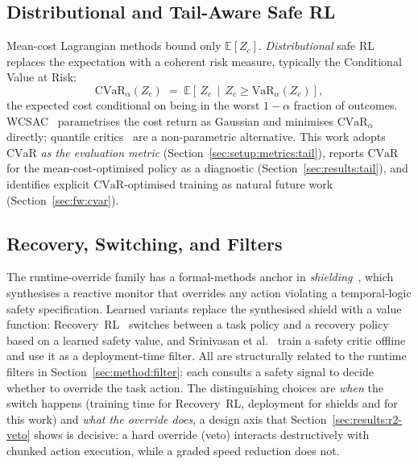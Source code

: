\documentclass[11pt,a4paper]{report}
\newcommand{\cvar}{\ensuremath{\mathrm{CVaR}}}
\begin{document}
\subsection{Distributional and Tail-Aware Safe RL}
\label{sec:bg:safe:distr}

Mean-cost Lagrangian methods bound only $\mathbb{E}[Z_c]$.
\emph{Distributional} safe RL replaces the expectation with a
coherent risk measure, typically the Conditional Value at Risk:
\begin{equation}
  \cvar_{\alpha}(Z_c) \;=\;
  \mathbb{E}\!\left[\, Z_c \,\middle|\, Z_c \ge \mathrm{VaR}_{\alpha}(Z_c) \right],
  \label{eq:cvar-def}
\end{equation}
the expected cost conditional on being in the worst $1-\alpha$
fraction of outcomes. WCSAC~\cite{yang2021wcsac,yang2023wcsacjournal}
parametrises the cost return as Gaussian and minimises
$\cvar_{\alpha}$ directly;
quantile critics~\cite{dabney2018qrdqn} are a non-parametric
alternative. This work adopts \cvar{} \emph{as the evaluation
metric} (Section~\ref{sec:setup:metrics:tail}), reports \cvar{} for
the mean-cost-optimised policy as a diagnostic
(Section~\ref{sec:results:tail}), and identifies explicit
\cvar{}-optimised training as natural future work
(Section~\ref{sec:fw:cvar}).

\subsection{Recovery, Switching, and Filters}
\label{sec:bg:safe:recovery}

The runtime-override family has a formal-methods anchor in
\emph{shielding}~\cite{alshiekh2018shielding,konighofer2025shields},
which synthesises a
reactive monitor that overrides any action violating a temporal-logic
safety specification. Learned variants replace the synthesised shield
with a value function: Recovery~RL~\cite{thananjeyan2021recovery}
switches between a task policy and a recovery policy based on a
learned safety value, and Srinivasan et
al.~\cite{srinivasan2020learning} train a safety critic offline and
use it as a deployment-time filter. All are structurally related to
the runtime filters in Section~\ref{sec:method:filter}: each consults
a safety signal to decide whether to override the task action. The
distinguishing choices are \emph{when} the switch happens (training
time for Recovery~RL, deployment for shields and for this work) and
\emph{what the override does}, a design axis that
Section~\ref{sec:results:r2-veto} shows is decisive: a hard override
(veto) interacts destructively with chunked action execution, while a
graded speed reduction does not.
\end{document}
